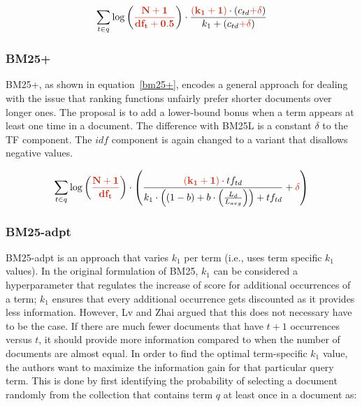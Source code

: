 \begin{equation}
	\label{bm25l}
	\sum_{t\in q} \log\left(\mathbf{\begingroup\color{ruhuisstijlrood}\frac{N+1}{df_t + 0.5}\endgroup}\right)\cdot\frac{\mathbf{\begingroup\color{ruhuisstijlrood}(k_1 + 1)\endgroup}\cdot(c_{td} \mathbf{\begingroup\color{ruhuisstijlrood}+ \delta\endgroup})}{k_1 + (c_{td} \mathbf{\begingroup\color{ruhuisstijlrood}+ \delta\endgroup})}
\end{equation}

\subsubsection{BM25+~\cite{bm25+}}
BM25+, as shown in equation~\ref{bm25+}, encodes a general approach for dealing with the issue that ranking functions unfairly prefer shorter documents over longer ones. The proposal is to add a lower-bound bonus when a term appears at least one time in a document. The difference with BM25L is a constant $\delta$ to the TF component. The $idf$ component is again changed to a variant that disallows negative values.

\begin{equation}
	\label{bm25+}
	\sum_{t\in q} \log\left(\mathbf{\begingroup\color{ruhuisstijlrood}\frac{N+1}{df_t}\endgroup}\right)\cdot\left(\frac{\mathbf{\begingroup\color{ruhuisstijlrood}\left(k_1 + 1\right)\endgroup}\cdot tf_{td}}{k_1\cdot\left(\left(1-b\right)+b\cdot\left(\frac{L_d}{L_{avg}}\right)\right)+tf_{td}}+\mathbf{\begingroup\color{ruhuisstijlrood}\delta\endgroup}\right)
\end{equation}

\subsubsection{BM25-adpt~\cite{bm25-adpt}}
BM25-adpt is an approach that varies $k_1$ per term (i.e., uses term specific $k_1$ values). In the original formulation of BM25, $k_1$ can be considered a hyperparameter that regulates the increase of score for additional occurrences of a term; $k_1$ ensures that every additional occurrence gets discounted as it provides less information. However, Lv and Zhai argued that this does not necessary have to be the case. If there are much fewer documents that have $t+1$ occurrences versus $t$, it should provide more information compared to when the number of documents are almost equal. In order to find the optimal term-specific $k_1$ value, the authors want to maximize the information gain for that particular query term. 
This is done by first identifying the probability of selecting a document randomly from the collection that contains term $q$ at least once in a document as:

